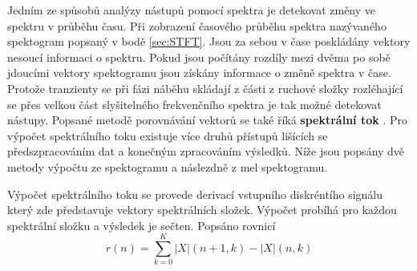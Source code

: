   Jedním ze spůsobů analýzy nástupů pomocí spektra je detekovat změny ve spektru v průběhu času. Při zobrazení časového průběhu spektra nazývaného spektogram popsaný v bodě \ref{sec:STFT}.
  Jsou za sebou v čase poskládány vektory nesoucí informaci o spektru.
  Pokud jsou počítány rozdíly mezi dvěma po sobě jdoucími vektory spektogramu jsou získány informace o změně spektra v čase.
  Protože tranzienty se při fázi náběhu skládají z části z ruchové složky rozléhající se přes velkou část slyšitelného frekvenčního spektra je tak možné detekovat nástupy.
  Popsané metodě porovnávání vektorů se také říká \textbf{spektrální tok} \cite{fundamental_of_music_processing}.
  Pro výpočet spektrálního toku existuje více druhů přístupů lišících se předszpracováním dat a konečným zpracováním výsledků.
  Níže jsou popsány dvě metody výpočtu ze spektogramu a náslezdně z mel spektogramu.

  Výpočet spektrálního toku se provede derivací vstupního diskréntího signálu který zde představuje vektory spektrálních složek. Výpočet probíhá pro každou spektrální složku a výsledek je sečten. Popsáno rovnicí 
\begin{equation}
  r(n) = \sum_{k = 0}^{K} |X|(n+1,k) - |X|(n,k)
\end{equation}

